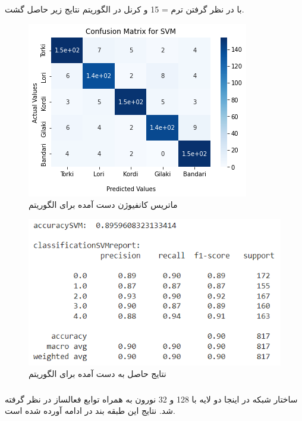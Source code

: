 \subsubsection{}
با در نظر گرفتن ترم  = 15 و 
کرنل  در الگوریتم 
نتایج زیر حاصل گشت.



\begin{figure}[h!]
	\centering
	\includegraphics[width=0.75\linewidth]{images/svm_cm_augment.png}
	\caption{ماتریس کانفیوژن دست آمده برای الگوریتم }
	\label{fig:svm_cm_augment}
\end{figure}


\begin{figure}[h!]
	\centering
	\includegraphics[width=0.9\linewidth]{images/svm_classification_results_augment.PNG}
	\caption{نتایج حاصل به دست آمده برای الگوریتم }
	\label{fig:svm_classification_results_augment}
\end{figure}
\newpage
\subsubsection{}
ساختار شبکه در اینجا دو لایه با 128 و 32 نورون به همراه توابع فعالساز  در نظر گرفته شد.
نتایج این طبقه بند در ادامه آورده شده است.

